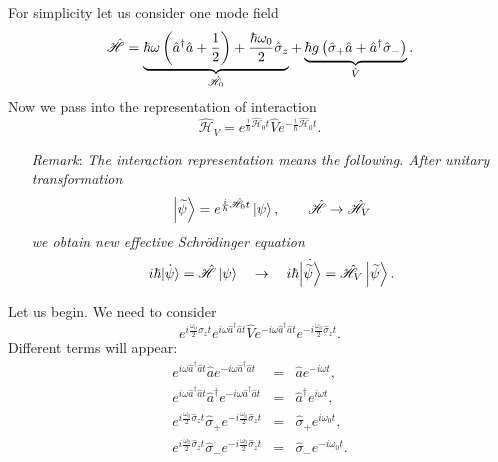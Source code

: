 For simplicity let us consider one mode field
\begin{equation}
	\hat{\mathscr{H}} = \underbrace{\hbar \omega \left( \hat{a}^{\dagger}\hat{a} + \frac{1}{2} \right) + \frac{\hbar \omega_0}{2} \hat{\sigma}_z}_{\hat{\mathscr{H}}_0} + \underbrace{\hbar g \left( \hat{\sigma}_+\hat{a} + \hat{a}^{\dagger} \hat{\sigma}_- \right)}_{\hat{V}}.
	\label{eq:hamillll}
\end{equation}
Now we pass into the representation of interaction
\begin{equation}
	\hat{\mathscr{H}}_V = e^{\frac{i}{\hbar} \hat{\mathscr{H}}_0 t} \hat{V} e^{-\frac{i}{\hbar} \hat{\mathscr{H}}_0 t}.
\end{equation}
\begin{enumerate}
	\item[\textit{Remark}:] \textit{The interaction representation means the following.
	After unitary transformation }
	\begin{equation*}
	\left\lvert {\widetilde{\psi}} \right\rangle = e^{\frac{i}{\hbar} \hat{\mathscr{H}}_0 t} \left\lvert {\psi} \right\rangle, \qquad \hat{\mathscr{H}} \to \hat{\mathscr{H}}_V
	\end{equation*}
	\textit{we obtain new effective Schrödinger equation}
	\begin{equation*}
	i \hbar \dot{\left\lvert {\psi} \right\rangle} = \hat{\mathscr{H}} \left\lvert {\psi} \right\rangle \quad \to \quad i \hbar \dot{\left\lvert {\widetilde{\psi}} \right\rangle} = \hat{\mathscr{H}}_V \left\lvert {\widetilde{\psi}} \right\rangle.
	\end{equation*}
\end{enumerate}
Let us begin. We need to consider
\begin{equation}
	e^{i \frac{\omega_0}{2} \hat{\sigma}_z t} e^{i \omega \hat{a}^{\dagger} \hat{a} t} \hat{V} e^{-i \omega \hat{a}^{\dagger} \hat{a} t} e^{-i \frac{\omega_0}{2} \hat{\sigma}_z t}.
\end{equation}
Different terms will appear:
\begin{eqnarray}
	e^{i \omega \hat{a}^{\dagger} \hat{a} t} \hat{a} e^{-i \omega \hat{a}^{\dagger} \hat{a} t} &=& \hat{a} e^{- i\omega t}, \\
	e^{i \omega \hat{a}^{\dagger} \hat{a} t} \hat{a}^{\dagger} e^{-i \omega \hat{a}^{\dagger} \hat{a} t} &=& \hat{a}^{\dagger} e^{i \omega t}, \\
	e^{i \frac{\omega_0}{2} \hat{\sigma}_z t} \hat{\sigma}_+ e^{-i \frac{\omega_0}{2} \hat{\sigma}_z t} &=& \hat{\sigma}_+ e^{i \omega_0 t}, \\
	e^{i \frac{\omega_0}{2} \hat{\sigma}_z t} \hat{\sigma}_- e^{-i \frac{\omega_0}{2} \hat{\sigma}_z t} &=& \hat{\sigma}_- e^{-i \omega_0 t}.
\end{eqnarray}
